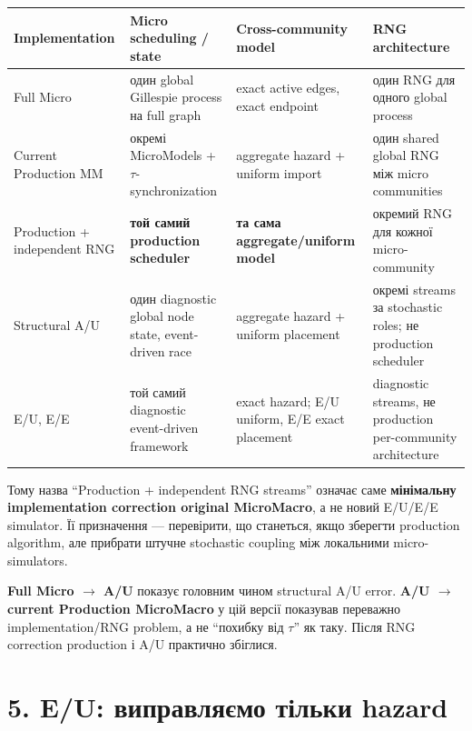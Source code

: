 \documentclass[11pt,a4paper]{article}
\begin{document}
\begin{center}
\small
\begin{tabular}{p{31mm} p{42mm} p{42mm} p{42mm}}
\toprule
\textbf{Implementation} & \textbf{Micro scheduling / state} & \textbf{Cross-community model} & \textbf{RNG architecture}\\
\midrule
Full Micro & один global Gillespie process на full graph & exact active edges, exact endpoint & один RNG для одного global process\\
Current Production MM & окремі MicroModels + $\tau$-synchronization & aggregate hazard + uniform import & один shared global RNG між micro communities\\
Production + independent RNG & \textbf{той самий production scheduler} & \textbf{та сама aggregate/uniform model} & окремий RNG для кожної micro-community\\
Structural A/U & один diagnostic global node state, event-driven race & aggregate hazard + uniform placement & окремі streams за stochastic roles; не production scheduler\\
E/U, E/E & той самий diagnostic event-driven framework & exact hazard; E/U uniform, E/E exact placement & diagnostic streams, не production per-community architecture\\
\bottomrule
\end{tabular}
\end{center}

Тому назва ``Production + independent RNG streams'' означає саме \textbf{мінімальну implementation correction original MicroMacro}, а не новий E/U/E/E simulator. Її призначення --- перевірити, що станеться, якщо зберегти production algorithm, але прибрати штучне stochastic coupling між локальними micro-simulators.

\begin{tcolorbox}[colback=soft,colframe=macro,title=Як це читати]
\textbf{Full Micro $\to$ A/U} показує головним чином structural A/U error.\newline
\textbf{A/U $\to$ current Production MicroMacro} у цій версії показував переважно implementation/RNG problem, а не ``похибку від $\tau$'' як таку. Після RNG correction production і A/U практично збіглися.
\end{tcolorbox}

\section*{5. E/U: виправляємо тільки hazard}
\end{document}
